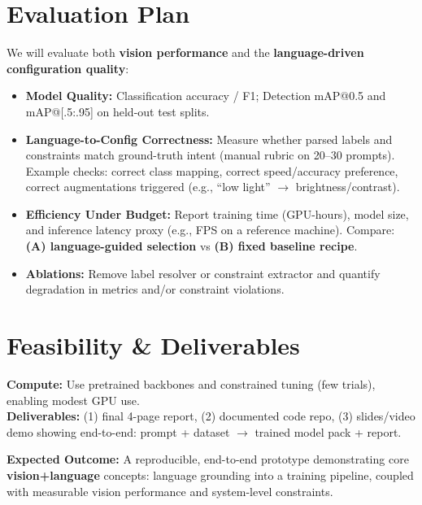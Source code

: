 \documentclass[10pt]{article}
\begin{document}
\section*{Evaluation Plan}
We will evaluate both \textbf{vision performance} and the \textbf{language-driven configuration quality}:

\begin{itemize}
  \item \textbf{Model Quality:} Classification accuracy / F1; Detection mAP@0.5 and mAP@[.5:.95] on held-out test splits.
  \item \textbf{Language-to-Config Correctness:} Measure whether parsed labels and constraints match ground-truth intent (manual rubric on 20--30 prompts). Example checks: correct class mapping, correct speed/accuracy preference, correct augmentations triggered (e.g., ``low light'' $\rightarrow$ brightness/contrast).
  \item \textbf{Efficiency Under Budget:} Report training time (GPU-hours), model size, and inference latency proxy (e.g., FPS on a reference machine). Compare: \textbf{(A) language-guided selection} vs \textbf{(B) fixed baseline recipe}.
  \item \textbf{Ablations:} Remove label resolver or constraint extractor and quantify degradation in metrics and/or constraint violations.
\end{itemize}

\section*{Feasibility \& Deliverables}
\textbf{Compute:} Use pretrained backbones and constrained tuning (few trials), enabling modest GPU use.\\
\textbf{Deliverables:} (1) final 4-page report, (2) documented code repo, (3) slides/video demo showing end-to-end: prompt + dataset $\rightarrow$ trained model pack + report.

\vspace{1pt}
\noindent\textbf{Expected Outcome:} A reproducible, end-to-end prototype demonstrating core \textbf{vision+language} concepts: language grounding into a training pipeline, coupled with measurable vision performance and system-level constraints.
\end{document}
